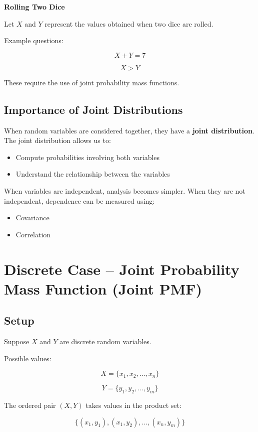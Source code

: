 \documentclass[12pt]{article}
\begin{document}
\textbf{Rolling Two Dice}

Let \(X\) and \(Y\) represent the values obtained when two dice are rolled.

Example questions:

\[
X + Y = 7
\]

\[
X > Y
\]

These require the use of joint probability mass functions.

\subsection*{Importance of Joint Distributions}

When random variables are considered together, they have a \textbf{joint distribution}. The joint distribution allows us to:

\begin{itemize}
\item Compute probabilities involving both variables
\item Understand the relationship between the variables
\end{itemize}

When variables are independent, analysis becomes simpler. When they are not independent, dependence can be measured using:

\begin{itemize}
\item Covariance
\item Correlation
\end{itemize}

\section{Discrete Case -- Joint Probability Mass Function (Joint PMF)}

\subsection*{Setup}

Suppose \(X\) and \(Y\) are discrete random variables.

Possible values:

\[
X = \{x_1, x_2, \dots , x_n\}
\]

\[
Y = \{y_1, y_2, \dots , y_m\}
\]

The ordered pair \((X,Y)\) takes values in the product set:

\[
\{(x_1,y_1),(x_1,y_2),\dots,(x_n,y_m)\}
\]
\end{document}
